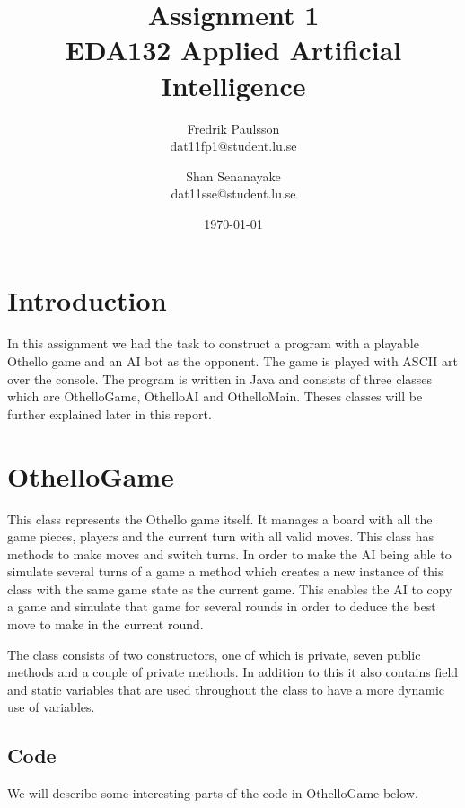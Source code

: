 \documentclass[a4paper]{article}
\title{Assignment 1 \\ EDA132 Applied Artificial Intelligence}
\date{\today}
\author{Fredrik Paulsson \\ dat11fp1@student.lu.se \and Shan Senanayake \\ dat11sse@student.lu.se}
\begin{document}
\maketitle


\section{Introduction}
In this assignment we had the task to construct a program with a playable Othello game and an AI bot as the opponent. The game is played with ASCII art over the console. The program is written in Java and consists of three classes which are OthelloGame, OthelloAI and OthelloMain. Theses classes will be further explained later in this report. \\

\section{OthelloGame}
This class represents the Othello game itself. It manages a board with all the game pieces, players and the current turn with all valid moves. This class has methods to make moves and switch turns. In order to make the AI being able to simulate several turns of a game a method which creates a new instance of this class with the same game state as the current game. This enables the AI to copy a game and simulate that game for several rounds in order to deduce the best move to make in the current round.

The class consists of two constructors, one of which is private, seven public methods and a couple of private methods. In addition to this it also contains field and static variables that are used throughout the class to have a more dynamic use of variables.

\subsection{Code}
We will describe some interesting parts of the code in OthelloGame below. 
\end{document}
